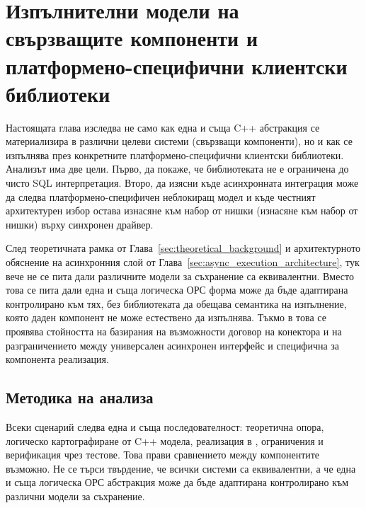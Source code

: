 \section{Изпълнителни модели на свързващите компоненти и платформено-специфични клиентски библиотеки}
\label{sec:backend_scenarios}

Настоящата глава изследва не само как една и съща C++ абстракция се материализира в различни целеви системи (свързващи компоненти), но и как се изпълнява през конкретните платформено-специфични клиентски библиотеки. Анализът има две цели. Първо, да покаже, че библиотеката не е ограничена до чисто SQL интерпретация. Второ, да изясни къде асинхронната интеграция може да следва платформено-специфичен неблокиращ модел и къде честният архитектурен избор остава изнасяне към набор от нишки (изнасяне към набор от нишки) върху синхронен драйвер.

След теоретичната рамка от Глава~\ref{sec:theoretical_background} и архитектурното обяснение на асинхронния слой от Глава~\ref{sec:async_execution_architecture}, тук вече не се пита дали различните модели за съхранение са еквивалентни. Вместо това се пита дали една и съща логическа ОРС форма може да бъде адаптирана контролирано към тях, без библиотеката да обещава семантика на изпълнение, която даден компонент не може естествено да изпълнява. Тъкмо в това се проявява стойността на базирания на възможности договор на конектора и на разграничението между универсален асинхронен интерфейс и специфична за компонента реализация.

\subsection{Методика на анализа}

Всеки сценарий следва една и съща последователност: теоретична опора, логическо картографиране от C++ модела, реализация в , ограничения и верификация чрез тестове. Това прави сравнението между компонентите възможно. Не се търси твърдение, че всички системи са еквивалентни, а че една и съща логическа ОРС абстракция може да бъде адаптирана контролирано към различни модели за съхранение.

